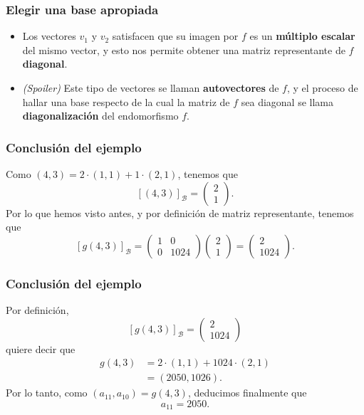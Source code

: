 \documentclass[12pt]{beamer}
\begin{document}
\begin{frame}
  \frametitle{Elegir una base apropiada}
  \begin{itemize}
    \item Los vectores $v_{1}$ y $v_{2}$ satisfacen que su imagen por $f$ es un \textbf{múltiplo escalar} del mismo vector, y esto nos permite obtener una matriz representante de $f$ \textbf{diagonal}.
      \pause
      \vspace{5mm}
    \item \textit{(Spoiler)} Este tipo de vectores se llaman \textbf{autovectores} de $f$,
  y el proceso de hallar una base respecto de la cual la matriz de $f$ sea diagonal se llama \textbf{diagonalización} del endomorfismo $f$.
  \end{itemize}

\end{frame}

\begin{frame}
  \frametitle{Conclusión del ejemplo}
  Como $(4,3) = 2 \cdot (1,1) + 1 \cdot (2,1)$,
  tenemos que
  \[
    [(4,3)]_{\mathcal{B}} =
    \begin{pmatrix}
      2 \\
      1
    \end{pmatrix}.
  \]
  Por lo que hemos visto antes,
  y por definición de matriz representante,
  tenemos que
  \[
    [g(4,3)]_{\mathcal{B}} =
    \begin{pmatrix}
      1 & 0 \\
      0 & 1024
    \end{pmatrix}
    \begin{pmatrix}
      2 \\
      1
    \end{pmatrix}
    =
    \begin{pmatrix}
      2 \\
      1024
    \end{pmatrix}.
  \]

\end{frame}

\begin{frame}
  \frametitle{Conclusión del ejemplo}
  Por definición,
  \[
    [g(4,3)]_{\mathcal{B}} =
    \begin{pmatrix}
      2 \\
      1024
    \end{pmatrix}
  \]
  quiere decir que
  \begin{align*}
    g(4,3) & = 2 \cdot (1,1) + 1024 \cdot (2,1) \\
    & = (2050, 1026).
  \end{align*}
  \pause
  Por lo tanto, como $(a_{11},a_{10}) = g(4,3)$,
  deducimos finalmente que
  \[
    a_{11} = 2050.
  \]

\end{frame}
\end{document}

